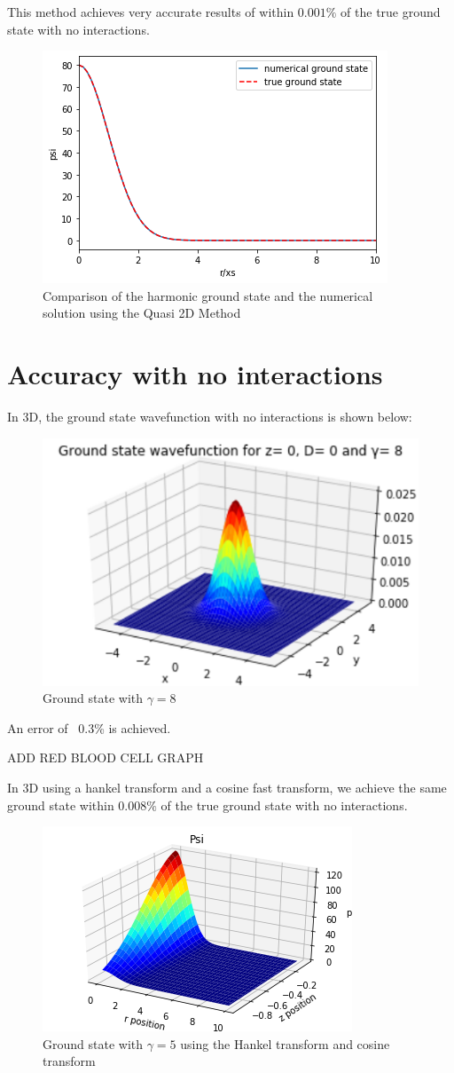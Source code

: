 \documentclass[10pt]{article}
\begin{document}
\begin{multicols}{2}
This method achieves very accurate results of within $0.001\%$ of the true ground state with no interactions.
\begin{figure}[H]
\centering
\includegraphics[width=0.6\linewidth]{gndstateQuasi2DHankel}
\caption{Comparison of the harmonic ground state and the numerical solution using the Quasi 2D Method}
\end{figure}


\section{Accuracy with no interactions}
In 3D, the ground state wavefunction with no interactions is shown below:

\begin{figure}[H]
\centering
\includegraphics[width=0.6\linewidth]{gndstate1}
\caption{Ground state with $\gamma=8$}
\end{figure}

An error of ~0.3\% is achieved.

ADD RED BLOOD CELL GRAPH

In 3D using a hankel transform and a cosine fast transform, we achieve the same ground state within $0.008\%$ of the true ground state with no interactions.

\begin{figure}[H]
\centering
\includegraphics[width=0.6\linewidth]{gndstate3DHankel}
\caption{Ground state with $\gamma=5$ using the Hankel transform and cosine transform}
\end{figure}



\end{multicols}
\end{document}
